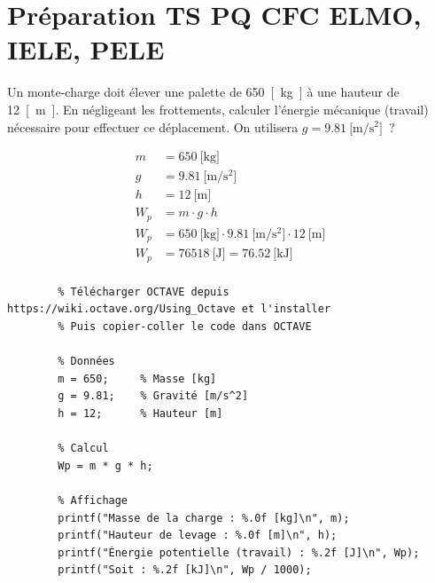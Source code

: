 \documentclass[a4paper,11pt,answers,addpoints]{exam}
\begin{document}
	
	
	\unframedsolutions
	\pointsinmargin
	\bracketedpoints
	\section*{Préparation TS PQ CFC ELMO, IELE, PELE}
	\begin{questions}

\question[6] Un monte-charge doit élever une palette de \qty{650}{[\kilo\gram]} à une hauteur de \qty{12}{[\meter]}. En négligeant les frottements, calculer l'énergie mécanique (travail) nécessaire pour effectuer ce déplacement. On utilisera $g = \qty{9,81}{[\meter/\second^2]}$~?
\vspace{0.5em}
\begin{solution}
	\begin{align*}
		m &= \qty{650}{[\kilo\gram]} \\[6pt]
		g &= \qty{9,81}{[\meter/\second^2]} \\[6pt]
		h &= \qty{12}{[\meter]} \\[6pt]
		W_p &= m \cdot g \cdot h \\[6pt]
		W_p &= \qty{650}{[\kilo\gram]} \cdot \qty{9,81}{[\meter/\second^2]} \cdot \qty{12}{[\meter]} \\[6pt]
		W_p &= \qty{76518}{[\joule]} = \qty{76,52}{[\kilo\joule]} \\[6pt]
	\end{align*}
	
	\begin{verbatim}
		% Télécharger OCTAVE depuis https://wiki.octave.org/Using_Octave et l'installer
		% Puis copier-coller le code dans OCTAVE
		
		% Données
		m = 650;     % Masse [kg]
		g = 9.81;    % Gravité [m/s^2]
		h = 12;      % Hauteur [m]
		
		% Calcul
		Wp = m * g * h;
		
		% Affichage
		printf("Masse de la charge : %.0f [kg]\n", m);
		printf("Hauteur de levage : %.0f [m]\n", h);
		printf("Énergie potentielle (travail) : %.2f [J]\n", Wp);
		printf("Soit : %.2f [kJ]\n", Wp / 1000);
	\end{verbatim}
\end{solution}
\end{questions}
\end{document}
